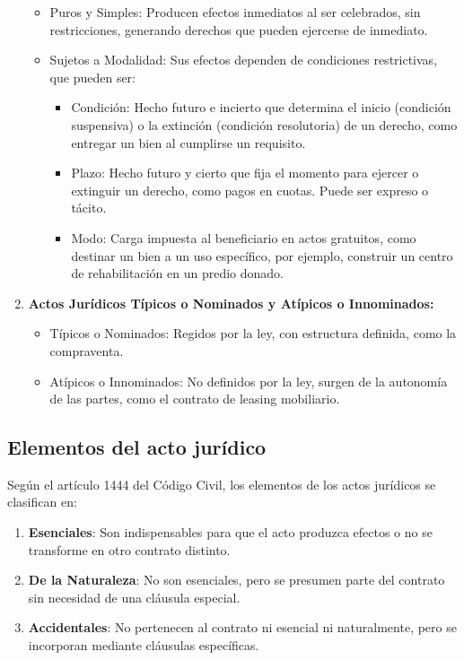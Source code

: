 \documentclass{templateNote}
\begin{document}
\begin{enumerate}
    \begin{itemize}
        \item Puros y Simples: Producen efectos inmediatos al ser celebrados, sin restricciones, generando derechos que pueden ejercerse de inmediato.
        \item Sujetos a Modalidad: Sus efectos dependen de condiciones restrictivas, que pueden ser:
        \begin{itemize}
            \item Condición: Hecho futuro e incierto que determina el inicio (condición suspensiva) o la extinción (condición resolutoria) de un derecho, como entregar un bien al cumplirse un requisito.
            \item Plazo: Hecho futuro y cierto que fija el momento para ejercer o extinguir un derecho, como pagos en cuotas. Puede ser expreso o tácito.
            \item Modo: Carga impuesta al beneficiario en actos gratuitos, como destinar un bien a un uso específico, por ejemplo, construir un centro de rehabilitación en un predio donado.
        \end{itemize}
    \end{itemize}
    \item \textbf{Actos Jurídicos Típicos o Nominados y Atípicos o Innominados:}
    \begin{itemize}
        \item Típicos o Nominados: Regidos por la ley, con estructura definida, como la compraventa.
        \item Atípicos o Innominados: No definidos por la ley, surgen de la autonomía de las partes, como el contrato de leasing mobiliario.
    \end{itemize}
\end{enumerate}

\subsection{Elementos del acto jurídico}

Según el artículo 1444 del Código Civil, los elementos de los actos jurídicos se clasifican en:

\begin{enumerate}
    \item \textbf{Esenciales}: Son indispensables para que el acto produzca efectos o no se transforme en otro contrato distinto.
    \item \textbf{De la Naturaleza}: No son esenciales, pero se presumen parte del contrato sin necesidad de una cláusula especial.
    \item \textbf{Accidentales}: No pertenecen al contrato ni esencial ni naturalmente, pero se incorporan mediante cláusulas específicas.
\end{enumerate}
\end{document}
